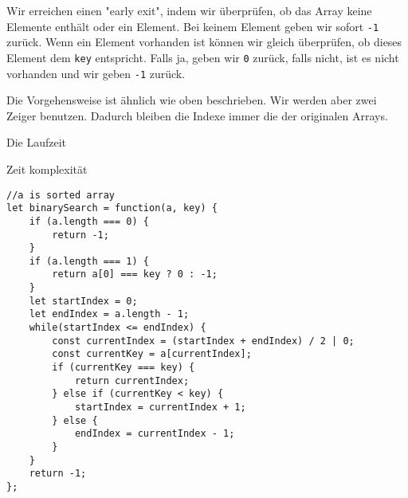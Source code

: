 \documentclass[babel]{book}
\begin{document}
Wir erreichen einen "early exit", indem wir überprüfen, ob das Array keine Elemente enthält oder ein Element. Bei keinem Element geben wir sofort \lstinline|-1| zurück. Wenn ein Element vorhanden ist können wir gleich überprüfen, ob dieses Element dem \lstinline|key| entspricht. Falls ja, geben wir \lstinline|0| zurück, falls nicht, ist es nicht vorhanden und wir geben \lstinline|-1| zurück.

Die Vorgehensweise ist ähnlich wie oben beschrieben. Wir werden aber zwei Zeiger benutzen. Dadurch bleiben die Indexe immer die der originalen Arrays.

Die Laufzeit

Zeit komplexität

\begin{lstlisting}[caption=My Javascript Example]
//a is sorted array
let binarySearch = function(a, key) {
	if (a.length === 0) {
		return -1;
	}
	if (a.length === 1) {
		return a[0] === key ? 0 : -1;
	}
	let startIndex = 0;
	let endIndex = a.length - 1;
	while(startIndex <= endIndex) {
		const currentIndex = (startIndex + endIndex) / 2 | 0;
		const currentKey = a[currentIndex];
		if (currentKey === key) {
			return currentIndex;
		} else if (currentKey < key) {
			startIndex = currentIndex + 1;
		} else {
			endIndex = currentIndex - 1;
		}
	}
	return -1;
};
\end{lstlisting}
\end{document}
